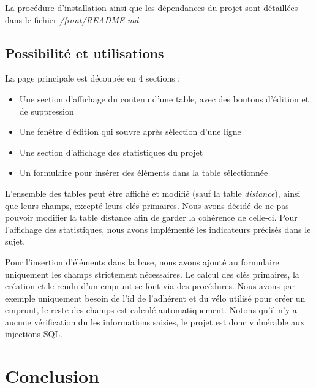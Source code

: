 \documentclass[10pt]{article}
\begin{document}
  La procédure d'installation ainsi que les dépendances du projet sont détaillées dans le fichier \mbox{\textit{/front/README.md}}.
  
  \subsection{Possibilité et utilisations}\label{subsec:possib}
  
La page principale est découpée en 4 sections :
  \begin{itemize}
  \item Une section d'affichage du contenu d'une table, avec des boutons d'édition et de suppression
  \item Une fenêtre d'édition qui souvre après sélection d'une ligne
  \item Une section d'affichage des statistiques du projet
  \item Un formulaire pour insérer des éléments dans la table sélectionnée \\
\end{itemize}

L'ensemble des tables peut être affiché et modifié (sauf la table \textit{distance}), ainsi que leurs champs, excepté leurs clés primaires. Nous avons décidé de ne pas pouvoir modifier la table distance afin de garder la cohérence de celle-ci. Pour l'affichage des statistiques, nous avons implémenté les indicateurs précisés dans le sujet.

Pour l'insertion d'éléments dans la base, nous avons ajouté au formulaire uniquement les champs strictement nécessaires. Le calcul des clés primaires, la création et le rendu d'un emprunt se font via des procédures. Nous avons par exemple uniquement besoin de l'id de l'adhérent et du vélo utilisé pour créer un emprunt, le reste des champs est calculé automatiquement. Notons qu'il n'y a aucune vérification du les informations saisies, le projet est donc vulnérable aux injections SQL.

  \section{Conclusion}\label{sec:ccl}
\end{document}
